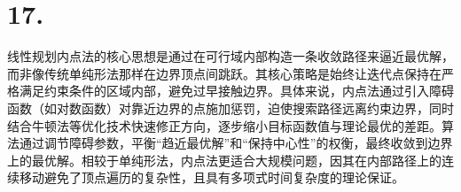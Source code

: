 \documentclass{article}
\begin{document}
	
	
	\section*{17.}
	
	线性规划内点法的核心思想是通过在可行域内部构造一条收敛路径来逼近最优解，而非像传统单纯形法那样在边界顶点间跳跃。其核心策略是始终让迭代点保持在严格满足约束条件的区域内部，避免过早接触边界。具体来说，内点法通过引入障碍函数（如对数函数）对靠近边界的点施加惩罚，迫使搜索路径远离约束边界，同时结合牛顿法等优化技术快速修正方向，逐步缩小目标函数值与理论最优的差距。算法通过调节障碍参数，平衡“趋近最优解”和“保持中心性”的权衡，最终收敛到边界上的最优解。相较于单纯形法，内点法更适合大规模问题，因其在内部路径上的连续移动避免了顶点遍历的复杂性，且具有多项式时间复杂度的理论保证。
	
	
\end{document}
